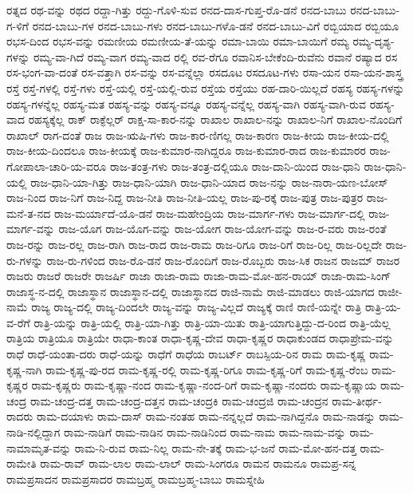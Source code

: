 {ರತ್ನದ
ರಥ-ವನ್ನು
ರಥದ
ರದ್ದಾ-ಗಿತ್ತು
ರದ್ದು-ಗೊಳಿ-ಸುವ
ರನದ-ದಾಸ-ಗುಪ್ತ-ರೊ-ಡನೆ
ರನದ-ಬಾಬು
ರನದ-ಬಾಬು-ಗ-ಳಿಗೆ
ರನದ-ಬಾಬು-ಗಳ
ರನದ-ಬಾಬು-ಗಳು
ರನದ-ಬಾಬು-ಗಳೊ-ಡನೆ
ರನದ-ಬಾಬು-ವಿಗೆ
ರಬ್ಬಿಯಾದ
ರಬ್ಬಿಯೂ
ರಭಸ-ದಿಂದ
ರಭಸ-ವನ್ನು
ರಮಣೀಯ
ರಮಣೀಯ-ತೆ-ಯನ್ನು
ರಮಾ-ಬಾಯಿ
ರಮಾ-ಬಾಯಿಗೆ
ರಮ್ಯ
ರಮ್ಯ-ದೃಶ್ಯ-ಗಳನ್ನು
ರಮ್ಯ-ವಾ-ಗಿದೆ
ರಮ್ಯ-ವಾಗ
ರಮ್ಯ-ವಾದ
ರಲ್ಲಿ
ರವ-ರೆಗೂ
ರವಾನಿಸ-ಬೇಕೆಂದಿ-ರುವೆನು
ರವಾನೆ
ರಷ್ಯಾದ
ರಸ
ರಸ-ಭಂಗ-ವಾ-ದಂತೆ
ರಸ-ವತ್ತಾಗಿ
ರಸ-ವನ್ನು
ರಸ-ವನ್ನೆಲ್ಲಾ
ರಸದೂಟ
ರಸದೂಟ-ಗಳು
ರಸಾ-ಯನ
ರಸಾ-ಯನ-ಶಾಸ್ತ್ರ
ರಸ್ತೆ
ರಸ್ತೆ-ಗಳಲ್ಲಿ
ರಸ್ತೆ-ಗಳು
ರಸ್ತೆ-ಯಲ್ಲಿ
ರಸ್ತೆ-ಯಲ್ಲಿ-ರುವ
ರಸ್ತೆಯ
ರಸ್ತೆಯು
ರಹ-ದಾರಿ-ಯಿಲ್ಲದೆ
ರಹಸ್ಯ
ರಹಸ್ಯ-ಗಳನ್ನು
ರಹಸ್ಯ-ಗಳನ್ನೆಲ್ಲ
ರಹಸ್ಯ-ಮತ
ರಹಸ್ಯ-ವನ್ನು
ರಹಸ್ಯ-ವನ್ನೂ
ರಹಸ್ಯ-ವನ್ನೆಲ್ಲ
ರಹಸ್ಯ-ವಾಗಿ
ರಹಸ್ಯ-ವಾಗಿ-ರುವ
ರಹಸ್ಯ-ವಾದ
ರಹಸ್ಯಕ್ಕೆಲ್ಲ
ರಾಕ್
ರಾಕ್ಫೆಲ್ಲರ್
ರಾಕ್ಷ-ಸಾ-ಕಾರ-ನನ್ನು
ರಾಖಾಲ
ರಾಖಾಲ-ನನ್ನು
ರಾಖಾಲ-ನಿಗೆ
ರಾಖಾಲ-ನೊಂದಿಗೆ
ರಾಖಾಲ್
ರಾಗ-ದಂತೆ
ರಾಜ
ರಾಜ-ಋಷಿ-ಗಳು
ರಾಜ-ಕಾರ-ಣಿಗಲ್ಲ
ರಾಜ-ಕಾರಣ
ರಾಜ-ಕೀಯ
ರಾಜ-ಕೀಯ-ದಲ್ಲಿ
ರಾಜ-ಕೀಯ-ದಿಂದಲೂ
ರಾಜ-ಕೀಯಕ್ಕೆ
ರಾಜ-ಕುಮಾರ-ನಾಗಿದ್ದರೂ
ರಾಜ-ಕುಮಾರ-ರಾದ
ರಾಜ-ಕುಮಾರರ
ರಾಜ-ಗೋಪಾಲಾ-ಚಾರಿ-ಯ-ವರೂ
ರಾಜ-ತಂತ್ರ-ಗಳು
ರಾಜ-ತಂತ್ರ-ದಲ್ಲಿಯೂ
ರಾಜ-ದಾನಿ-ಯಿಂದ
ರಾಜ-ಧಾನಿ
ರಾಜ-ಧಾನಿ-ಯಲ್ಲಿ
ರಾಜ-ಧಾನಿ-ಯಾ-ಗಿತ್ತು
ರಾಜ-ಧಾನಿ-ಯಾಗಿ
ರಾಜ-ಧಾನಿ-ಯಾದ
ರಾಜ-ನನ್ನು
ರಾಜ-ನಾರಾ-ಯಣ-ಬೋಸ್
ರಾಜ-ನಿಂದ
ರಾಜ-ನಿಗೆ
ರಾಜ-ನಿದ್ದ
ರಾಜ-ನೀತಿ
ರಾಜ-ನೀತಿ-ಯಲ್ಲ
ರಾಜ-ಪು-ರಕ್ಕೆ
ರಾಜ-ಪುತ್ರ
ರಾಜ-ಪುತ್ರರ
ರಾಜ-ಮನೆ-ತ-ನದ
ರಾಜ-ಮರ್ಯಾದೆ-ಯೊ-ಡನೆ
ರಾಜ-ಮಹೇಂದ್ರಿಯ
ರಾಜ-ಮಾರ್ಗ-ಗಳು
ರಾಜ-ಮಾರ್ಗ-ದಲ್ಲಿ
ರಾಜ-ಮಾರ್ಗ-ವನ್ನು
ರಾಜ-ಯೊಗ
ರಾಜ-ಯೊಗ-ವನ್ನು
ರಾಜ-ಯೋಗ
ರಾಜ-ಯೋಗ-ವನ್ನು
ರಾಜ-ರ-ವರು
ರಾಜ-ರಂತೆ
ರಾಜ-ರನ್ನು
ರಾಜ-ರಲ್ಲ
ರಾಜ-ರಾಗಿ
ರಾಜ-ರಾದ
ರಾಜ-ರಾಮ
ರಾಜ-ರಿಗೂ
ರಾಜ-ರಿಗೆ
ರಾಜ-ರಿಲ್ಲ
ರಾಜ-ರಿಲ್ಲದೇ
ರಾಜ-ರು-ಗಳನ್ನು
ರಾಜ-ರು-ಗಳಿಂದ
ರಾಜ-ರೊ-ಡನೆ
ರಾಜ-ರೊಂದಿಗೆ
ರಾಜ-ರೊಬ್ಬರು
ರಾಜ-ಸಿಕ
ರಾಜನ
ರಾಜಮ್
ರಾಜರ
ರಾಜರು
ರಾಜರೆ
ರಾಜರೇ
ರಾಜರ್ಷಿ
ರಾಜಾ
ರಾಜಾ-ರಾಮ
ರಾಜಾ-ರಾಮ-ಮೋ-ಹನ-ರಾಯ್
ರಾಜಾ-ರಾಮ-ಸಿಂಗ್
ರಾಜಾಸ್ಥ-ನ-ದಲ್ಲಿ
ರಾಜಾಸ್ಥಾನ
ರಾಜಾಸ್ಥಾನ-ದಲ್ಲಿ
ರಾಜಾಸ್ಥಾನದ
ರಾಜಿ-ನಾಮೆ
ರಾಜಿ-ಮಾಡಲು
ರಾಜಿ-ಯಾಗದ
ರಾಜೀ-ನಾಮೆ
ರಾಜ್ಯ
ರಾಜ್ಯ-ದಲ್ಲಿ
ರಾಜ್ಯ-ದಿಂದಲೇ
ರಾಜ್ಯ-ವನ್ನು
ರಾಜ್ಯ-ವಿಲ್ಲದೆ
ರಾಜ್ಯಕ್ಕೆ
ರಾಣಿ
ರಾಣಿ-ಯನ್ನೇ
ರಾತ್ರಿ
ರಾತ್ರಿ-ಯ-ವ-ರೆಗೆ
ರಾತ್ರಿ-ಯನ್ನು
ರಾತ್ರಿ-ಯಲ್ಲಿ
ರಾತ್ರಿ-ಯಾ-ಗಿತ್ತು
ರಾತ್ರಿ-ಯಾ-ಯಿತು
ರಾತ್ರಿ-ಯಾಗುತ್ತಿದ್ದು-ದ-ರಿಂದ
ರಾತ್ರಿ-ಯೆಲ್ಲ
ರಾತ್ರಿಯ
ರಾತ್ರಿಯೂ
ರಾತ್ರಿಯೇ
ರಾಧಾ-ಕಾಂತ
ರಾಧಾ-ಕೃಷ್ಣ-ದೇವ
ರಾಧಾ-ಕೃಷ್ಣರ
ರಾಧಾಕುಂಡದ
ರಾಧಾಪ್ರೇಮ-ವನ್ನು
ರಾಧೆ
ರಾಧೆ-ಯಂತಾ-ದರು
ರಾಧೆ-ಯನ್ನು
ರಾಧೆಗೆ
ರಾಧೆಯ
ರಾಬರ್ಟ್
ರಾಬಸ್ಪಿಯ-ರಿನ
ರಾಮ
ರಾಮ-ಕೃಷ್ಣ
ರಾಮ-ಕೃಷ್ಣ-ನಾಗಿ
ರಾಮ-ಕೃಷ್ಣ-ಪು-ರದ
ರಾಮ-ಕೃಷ್ಣ-ರಲ್ಲಿ
ರಾಮ-ಕೃಷ್ಣ-ರಿಗೂ
ರಾಮ-ಕೃಷ್ಣ-ರಿಗೆ
ರಾಮ-ಕೃಷ್ಣ-ರೆಂಬ
ರಾಮ-ಕೃಷ್ಣರ
ರಾಮ-ಕೃಷ್ಣರು
ರಾಮ-ಕೃಷ್ಣಾ-ನಂದ
ರಾಮ-ಕೃಷ್ಣಾ-ನಂದ-ರಿಗೆ
ರಾಮ-ಕೃಷ್ಣಾ-ನಂದರು
ರಾಮ-ಕೃಷ್ಣಾಯ
ರಾಮ-ಚಂದ್ರ
ರಾಮ-ಚಂದ್ರ-ದತ್ತ
ರಾಮ-ಚಂದ್ರ-ದತ್ತನ
ರಾಮ-ಚಂದ್ರಕಿ
ರಾಮ-ಚಂದ್ರಜಿ
ರಾಮ-ಚಂದ್ರನ
ರಾಮ-ತೀರ್ಥ-ರಾದರು
ರಾಮ-ದಯಾಳು
ರಾಮ-ದಾಸ್
ರಾಮ-ನಂತಹ
ರಾಮ-ನನ್ನಲ್ಲದೆ
ರಾಮ-ನಾಗಿದ್ದನೊ
ರಾಮ-ನಾಡನ್ನು
ರಾಮ-ನಾಡಿ-ನಲ್ಲಿದ್ದಾಗ
ರಾಮ-ನಾಡಿಗೆ
ರಾಮ-ನಾಡಿನ
ರಾಮ-ನಾಡಿನಿಂದ
ರಾಮ-ನಾಮ
ರಾಮ-ನಾಮ-ವನ್ನು
ರಾಮ-ನಾಮಾಮೃತ-ವನ್ನು
ರಾಮ-ನಿ-ರುವ
ರಾಮ-ನಿಲ್ಲ
ರಾಮ-ನೇ-ತಕ್ಕೆ
ರಾಮ-ಭ-ಜನೆ
ರಾಮ-ಮೋ-ಹನ-ದತ್ತ
ರಾಮ-ರಾಮೇತಿ
ರಾಮ-ರಾವ್
ರಾಮ-ಲಾಲ
ರಾಮ-ಲಾಲ್
ರಾಮ-ಸಿಂಗರೂ
ರಾಮನ
ರಾಮನೂ
ರಾಮಪ್ರ-ಸನ್ನ
ರಾಮಪ್ರಸಾದನ
ರಾಮಪ್ರಸಾದರ
ರಾಮಬ್ರಹ್ಮ
ರಾಮಬ್ರಹ್ಮ-ಬಾಬು
ರಾಮಸ್ನೇಹಿ
}
